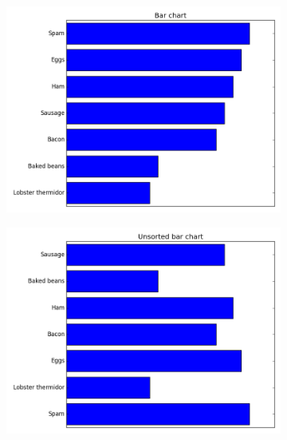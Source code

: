 \begin{figure}[h] %
\centering
\begin{subfigure}{.45\textwidth}
  \centering
  \includegraphics[width=\textwidth]{bar_chart_horizontal_sorted.png}
\end{subfigure}
\begin{subfigure}{.45\textwidth}
  \centering
  \includegraphics[width=\textwidth]{bar_chart_unsorted.png}
\end{subfigure}
\begin{subfigure}{.45\textwidth}
  \centering

\end{subfigure}
\end{figure}
